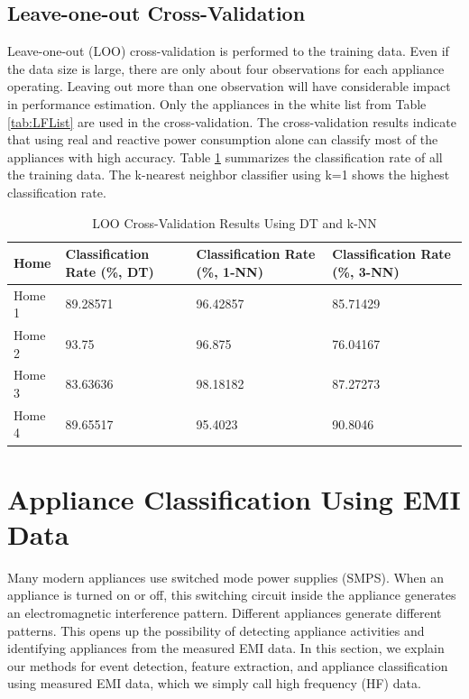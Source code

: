 \documentclass[11pt, letterpaper]{article}
\begin{document}
\subsection{Leave-one-out Cross-Validation}
Leave-one-out (LOO) cross-validation is performed to the training data.  Even if the data size is large, there are only about four observations for each appliance operating.  Leaving out more than one observation will have considerable impact in performance estimation.  Only the appliances in the white list from Table \ref{tab:LFList} are used in the cross-validation.  The cross-validation results indicate that using real and reactive power consumption alone can classify most of the appliances with high accuracy.
Table \ref{tab:loo} summarizes the classification rate of all the training data. The k-nearest neighbor classifier using k=1 shows the highest classification rate.
\begin{table}[h]
\caption{LOO Cross-Validation Results Using DT and k-NN}
\begin{center}
\begin{tabular}{|p{1.5cm}|p{3.5cm}|p{3.5cm}|p{3.5cm}|}\hline
\textbf{Home} & \textbf{Classification Rate (\%, DT)}& \textbf{Classification Rate (\%, 1-NN)}& \textbf{Classification Rate (\%, 3-NN)}\\
\hline
Home 1 & 89.28571 & 96.42857 & 85.71429\\
\hline
Home 2 & 93.75 & 96.875 & 76.04167\\
\hline
Home 3 & 83.63636 & 98.18182 & 87.27273\\
\hline
Home 4 & 89.65517 & 95.4023 & 90.8046\\
\hline
\end{tabular}
\end{center}
\label{tab:loo}
\end{table}





\section{Appliance Classification Using EMI Data}\label{hfapproach}
Many modern appliances use switched mode power supplies (SMPS). When an appliance is turned on or off, this switching circuit inside the appliance generates an electromagnetic interference pattern. Different appliances generate different patterns. This opens up the possibility of detecting appliance activities and identifying appliances from the measured EMI data. In this section, we explain our methods for event detection, feature extraction, and appliance classification using measured EMI data, which we simply call high frequency (HF) data.
\end{document}
